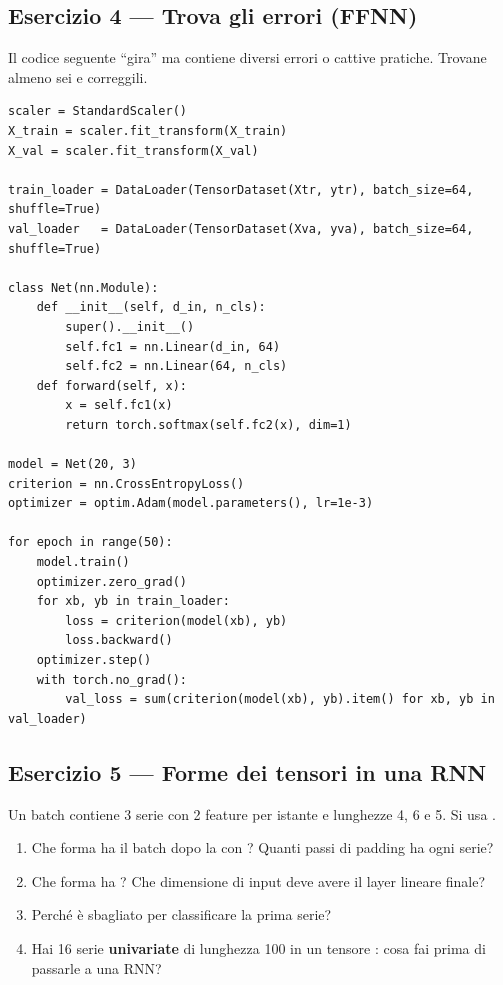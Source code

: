 \subsection*{Esercizio 4 --- Trova gli errori (FFNN)}\label{es:e4}
Il codice seguente ``gira'' ma contiene diversi errori o cattive pratiche. Trovane almeno sei e correggili.
\begin{lstlisting}
scaler = StandardScaler()
X_train = scaler.fit_transform(X_train)
X_val = scaler.fit_transform(X_val)

train_loader = DataLoader(TensorDataset(Xtr, ytr), batch_size=64, shuffle=True)
val_loader   = DataLoader(TensorDataset(Xva, yva), batch_size=64, shuffle=True)

class Net(nn.Module):
    def __init__(self, d_in, n_cls):
        super().__init__()
        self.fc1 = nn.Linear(d_in, 64)
        self.fc2 = nn.Linear(64, n_cls)
    def forward(self, x):
        x = self.fc1(x)
        return torch.softmax(self.fc2(x), dim=1)

model = Net(20, 3)
criterion = nn.CrossEntropyLoss()
optimizer = optim.Adam(model.parameters(), lr=1e-3)

for epoch in range(50):
    model.train()
    optimizer.zero_grad()
    for xb, yb in train_loader:
        loss = criterion(model(xb), yb)
        loss.backward()
    optimizer.step()
    with torch.no_grad():
        val_loss = sum(criterion(model(xb), yb).item() for xb, yb in val_loader)
\end{lstlisting}

\subsection*{Esercizio 5 --- Forme dei tensori in una RNN}\label{es:e5}
Un batch contiene 3 serie con 2 feature per istante e lunghezze 4, 6 e 5. Si usa
.
\begin{enumerate}[label=(\alph*)]
  \item Che forma ha il batch dopo la  con ? Quanti passi di padding ha ogni serie?
  \item Che forma ha ? Che dimensione di input deve avere il layer lineare finale?
  \item Perché  è sbagliato per classificare la prima serie?
  \item Hai 16 serie \textbf{univariate} di lunghezza 100 in un tensore : cosa fai prima di passarle a una RNN?
\end{enumerate}

